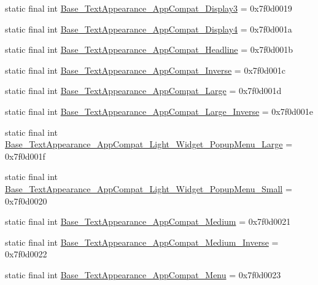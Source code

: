 \begin{DoxyCompactItemize}
\item 
static final int \mbox{\hyperlink{classandroid_1_1support_1_1design_1_1R_1_1style_a275f10f2ac27d2da0ba760911d80f132}{Base\+\_\+\+Text\+Appearance\+\_\+\+App\+Compat\+\_\+\+Display3}} = 0x7f0d0019
\item 
static final int \mbox{\hyperlink{classandroid_1_1support_1_1design_1_1R_1_1style_a4e66214538390426535adc790a14e781}{Base\+\_\+\+Text\+Appearance\+\_\+\+App\+Compat\+\_\+\+Display4}} = 0x7f0d001a
\item 
static final int \mbox{\hyperlink{classandroid_1_1support_1_1design_1_1R_1_1style_aac8bfe611719aa125f106f747f4c582e}{Base\+\_\+\+Text\+Appearance\+\_\+\+App\+Compat\+\_\+\+Headline}} = 0x7f0d001b
\item 
static final int \mbox{\hyperlink{classandroid_1_1support_1_1design_1_1R_1_1style_a8f575fb7354eb689d4fa5a254cec65bf}{Base\+\_\+\+Text\+Appearance\+\_\+\+App\+Compat\+\_\+\+Inverse}} = 0x7f0d001c
\item 
static final int \mbox{\hyperlink{classandroid_1_1support_1_1design_1_1R_1_1style_a92a330241ceb1bd4b3d508a9024f69ce}{Base\+\_\+\+Text\+Appearance\+\_\+\+App\+Compat\+\_\+\+Large}} = 0x7f0d001d
\item 
static final int \mbox{\hyperlink{classandroid_1_1support_1_1design_1_1R_1_1style_a3af9338b78523cbd0bf2bb8c522aa6e8}{Base\+\_\+\+Text\+Appearance\+\_\+\+App\+Compat\+\_\+\+Large\+\_\+\+Inverse}} = 0x7f0d001e
\item 
static final int \mbox{\hyperlink{classandroid_1_1support_1_1design_1_1R_1_1style_a5541db6161143bcd88a34c99173206b0}{Base\+\_\+\+Text\+Appearance\+\_\+\+App\+Compat\+\_\+\+Light\+\_\+\+Widget\+\_\+\+Popup\+Menu\+\_\+\+Large}} = 0x7f0d001f
\item 
static final int \mbox{\hyperlink{classandroid_1_1support_1_1design_1_1R_1_1style_a7030c0ee4caa8ad4f83264595a9665ac}{Base\+\_\+\+Text\+Appearance\+\_\+\+App\+Compat\+\_\+\+Light\+\_\+\+Widget\+\_\+\+Popup\+Menu\+\_\+\+Small}} = 0x7f0d0020
\item 
static final int \mbox{\hyperlink{classandroid_1_1support_1_1design_1_1R_1_1style_a84633763d93f6cad04ea614f8458d723}{Base\+\_\+\+Text\+Appearance\+\_\+\+App\+Compat\+\_\+\+Medium}} = 0x7f0d0021
\item 
static final int \mbox{\hyperlink{classandroid_1_1support_1_1design_1_1R_1_1style_a5b24f05ad226eb4d1d3eb501c1149688}{Base\+\_\+\+Text\+Appearance\+\_\+\+App\+Compat\+\_\+\+Medium\+\_\+\+Inverse}} = 0x7f0d0022
\item 
static final int \mbox{\hyperlink{classandroid_1_1support_1_1design_1_1R_1_1style_a02a1f468dcd22f86db2c9461e3bed64f}{Base\+\_\+\+Text\+Appearance\+\_\+\+App\+Compat\+\_\+\+Menu}} = 0x7f0d0023

\end{DoxyCompactItemize}
